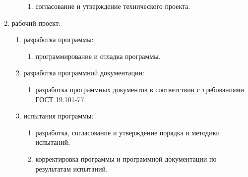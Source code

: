 \begin{enumerate}
\begin{enumerate}
\begin{enumerate}
        \item согласование и утверждение технического проекта. 
    \end{enumerate}
\end{enumerate}
\item рабочий проект:
\begin{enumerate}
    \item разработка программы:
    \begin{enumerate}
        \item программирование и отладка программы. 
    \end{enumerate}
    \item разработка программной документации:
    \begin{enumerate}
        \item разработка программных документов в соответствии с требованиями ГОСТ 19.101-77\cite{gostAll}. 
    \end{enumerate}
    \item испытания программы:
    \begin{enumerate}
        \item разработка, согласование и утверждение порядка и методики испытаний; 
        \item корректировка программы и программной документации по результатам испытаний.
    \end{enumerate}
\end{enumerate}
\end{enumerate}
